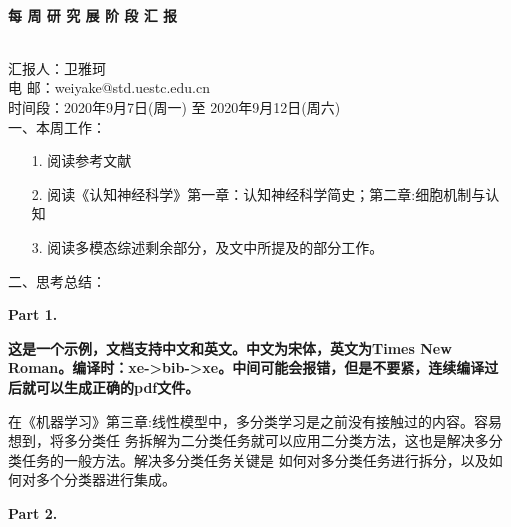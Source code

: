 \documentclass[UTF8,10.5pt]{article} %
\begin{document}
~\\
\centerline{ \large \bf{每} \hspace{0.07cm} \bf{周}\hspace{0.07cm} \bf{研} \hspace{0.07cm}\bf{究} \hspace{0.07cm}\bf{展} \hspace{0.07cm}\bf{阶}\hspace{0.07cm} \bf{段}\hspace{0.07cm} \bf{汇} \hspace{0.07cm}\bf{报}}
~\\

\noindent 汇报人：卫雅珂 \\
\noindent 电\hspace{0.29cm} 邮：weiyake@std.uestc.edu.cn \\
\noindent 时间段：2020年9月7日(周一) 至 2020年9月12日(周六) \\

\noindent 一、本周工作：

\begin{enumerate}[labelsep = .5em, leftmargin = -18pt, itemindent = 3em]
    \item [1.] 阅读参考文献\cite{tian2021unsupervised,NEURIPS2018_01161aaa,gao2018learning,uijlings2013selective,cinbis2016weakly}    
    \item [2.] 阅读《认知神经科学》第一章：认知神经科学简史；第二章:细胞机制与认知
    \item [3.] 阅读多模态综述剩余部分，及文中所提及的部分工作。
\end{enumerate}
\vspace{0.3cm}

\noindent 二、思考总结：

\noindent \textbf{Part 1.} 

\textbf{这是一个示例，文档支持中文和英文。中文为宋体，英文为Times New Roman。编译时：xe->bib->xe。中间可能会报错，但是不要紧，连续编译过后就可以生成正确的pdf文件。}

在《机器学习》第三章:线性模型中，多分类学习是之前没有接触过的内容。容易想到，将多分类任 务拆解为二分类任务就可以应用二分类方法，这也是解决多分类任务的一般方法。解决多分类任务关键是 如何对多分类任务进行拆分，以及如何对多个分类器进行集成。

\vspace{0.5cm}
\noindent \textbf{Part 2.} 
\end{document}
